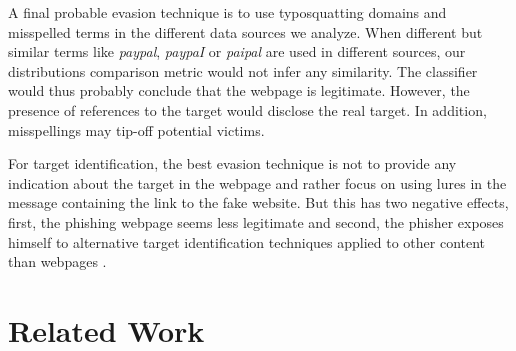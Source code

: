 \documentclass[10pt,conference,compsocconf,letterpaper]{IEEEtran}
\begin{document}
A final probable evasion technique is to use typosquatting domains and misspelled terms in the different data sources we analyze. When different but similar terms like \textit{paypal}, \textit{paypaI} or \textit{paipal} are used in different sources, our distributions comparison metric would not infer any similarity.
The classifier would thus probably conclude that the webpage is legitimate. However, the presence of references to the target would disclose the real target. In addition, misspellings may tip-off potential victims.

For target identification, the best evasion technique is not to provide any indication about the target in the webpage and rather focus on using lures in the message containing the link to the fake website. But this has two negative effects, first, the phishing webpage seems less legitimate and second, the phisher exposes himself to alternative target identification techniques applied to other content than webpages \cite{ramanathan:2013:phishing}.
\section{Related Work}
\label{sec:soa}
\end{document}
